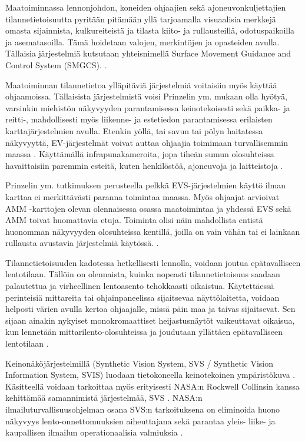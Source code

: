 \documentclass[utf8,bachelor,manualbib]{gradu3}
\begin{document}
Maatoiminnassa lennonjohdon, koneiden ohjaajien sekä ajoneuvonkuljettajien tilannetietoisuutta pyritään pitämään yllä tarjoamalla visuaalisia merkkejä omasta sijainnista, kulkureiteistä ja tilasta kiito- ja rullausteillä, odotuspaikoilla ja asematasoilla. Tämä hoidetaan valojen, merkintöjen ja opasteiden avulla. Tällaisia järjestelmiä kutsutaan yhteisnimellä Surface Movement Guidance and Control System (SMGCS). \citep{prinzel2013}.

Maatoiminnan tilannetietoa ylläpitäviä järjestelmiä voitaisiin myös käyttää ohjaamoissa. Tällaisista järjestelmistä voisi Prinzelin ym. \citeyearpar{prinzel2013} mukaan olla hyötyä, varsinkin miehistön näkyvyyden parantamisessa keinotekoisesti sekä paikka- ja reitti-,  mahdollisesti myös liikenne- ja estetiedon parantamisessa erilaisten karttajärjestelmien avulla. Etenkin yöllä, tai savun tai pölyn haitatessa näkyvyyttä, EV-järjestelmät voivat auttaa ohjaajia toimimaan turvallisemmin maassa \citep{prinzel2013}. Käyttämällä infrapunakameroita, jopa tiheän sumun olosuhteissa havaittaisiin paremmin esteitä, kuten henkilöstöä, ajoneuvoja ja laitteistoja \citep{beiergemperlein2004}.

Prinzelin ym. \citeyearpar{prinzel2013} tutkimuksen perusteella pelkkä EVS-järjestelmien käyttö ilman karttaa ei merkittävästi paranna toimintaa maassa. Myös ohjaajat arvioivat AMM -karttojen olevan olennaisessa osassa maatoimintaa ja yhdessä EVS sekä AMM toivat huomattavia etuja. Toiminta olisi näin mahdollista entistä huonomman näkyvyyden olosuhteissa kentillä, joilla on vain vähän tai ei lainkaan rullausta avustavia järjestelmiä käytössä. \citep{prinzel2013}.

Tilannetietoisuuden kadotessa hetkellisesti lennolla, voidaan joutua epätavalliseen lentotilaan. Tällöin on olennaista, kuinka nopeasti tilannetietoisuus saadaan palautettua ja virheellinen lentoasento tehokkaasti oikaistua. Käytettäessä perinteisiä mittareita tai ohjainpaneelissa sijaitsevaa näyttölaitetta, voidaan helposti värien avulla kertoa ohjaajalle, missä päin maa ja taivas sijaitsevat. Sen sijaan ainakin nykyiset monokromaattiset heijastusnäytöt vaikeuttavat oikaisua, kun lennetään mittarilento-olosuhteissa ja joudutaan yllättäen epätavalliseen lentotilaan \citep{crawfordneal2006}.

Keinonäköjärjestelmillä (Synthetic Vision System, SVS / Synthetic Vision Information System, SVIS) luodaan tietokoneella keinotekoinen ympäristökuva \citep{baileyym2007}. Käsitteellä voidaan tarkoittaa myös erityisesti NASA:n Rockwell Collinsin kanssa kehittämää samannimistä järjestelmää, SVS \citep{crawfordneal2006}. NASA:n ilmailuturvallisuusohjelman osana SVS:n tarkoituksena on eliminoida huono näkyvyys lento-onnettomuuksien aiheuttajana sekä parantaa yleis- liike- ja kaupallisen ilmailun operationaalisia valmiuksia \citeyearpar{prinzel2004}.
\end{document}
